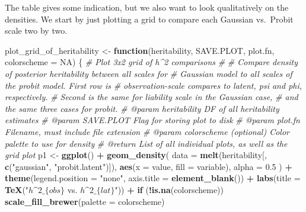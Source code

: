 \documentclass[
]{article}
\newenvironment{Shaded}{\begin{snugshade}}{\end{snugshade}}
\newcommand{\AttributeTok}[1]{\textcolor[rgb]{0.13,0.29,0.53}{#1}}
\newcommand{\CommentTok}[1]{\textcolor[rgb]{0.56,0.35,0.01}{\textit{#1}}}
\newcommand{\ConstantTok}[1]{\textcolor[rgb]{0.56,0.35,0.01}{#1}}
\newcommand{\ControlFlowTok}[1]{\textcolor[rgb]{0.13,0.29,0.53}{\textbf{#1}}}
\newcommand{\FloatTok}[1]{\textcolor[rgb]{0.00,0.00,0.81}{#1}}
\newcommand{\FunctionTok}[1]{\textcolor[rgb]{0.13,0.29,0.53}{\textbf{#1}}}
\newcommand{\NormalTok}[1]{#1}
\newcommand{\OtherTok}[1]{\textcolor[rgb]{0.56,0.35,0.01}{#1}}
\newcommand{\SpecialCharTok}[1]{\textcolor[rgb]{0.81,0.36,0.00}{\textbf{#1}}}
\newcommand{\StringTok}[1]{\textcolor[rgb]{0.31,0.60,0.02}{#1}}
\begin{document}
The table gives some indication, but we also want to look qualitatively
on the densities. We start by just plotting a grid to compare each
Gaussian vs.~Probit scale two by two.

\begin{Shaded}
\begin{Highlighting}[]
\NormalTok{plot\_grid\_of\_heritability }\OtherTok{\textless{}{-}} \ControlFlowTok{function}\NormalTok{(heritability, SAVE.PLOT,}
\NormalTok{                                      plot.fn, }\AttributeTok{colorscheme =} \ConstantTok{NA}\NormalTok{) \{}
  \CommentTok{\#\textquotesingle{} Plot 3x2 grid of h\^{}2 comparisons}
  \CommentTok{\#\textquotesingle{}}
  \CommentTok{\#\textquotesingle{} Compare density of posterior heritability between all scales for}
  \CommentTok{\#\textquotesingle{} Gaussian model to all scales of the probit model. First row is}
  \CommentTok{\#\textquotesingle{} observation{-}scale compares to latent, psi and phi, respectively.}
  \CommentTok{\#\textquotesingle{} Second is the same for liability scale in the Gaussian case,}
  \CommentTok{\#\textquotesingle{} and the same three cases for probit.}
  \CommentTok{\#\textquotesingle{} @param heritability DF of all heritability estimates}
  \CommentTok{\#\textquotesingle{} @param SAVE.PLOT Flag for storing plot to disk}
  \CommentTok{\#\textquotesingle{} @param plot.fn Filename, must include file extension}
  \CommentTok{\#\textquotesingle{} @param colorscheme (optional) Color palette to use for density}
  \CommentTok{\#\textquotesingle{} @return List of all individual plots, as well as the grid plot}
\NormalTok{  p1 }\OtherTok{\textless{}{-}} \FunctionTok{ggplot}\NormalTok{() }\SpecialCharTok{+}
    \FunctionTok{geom\_density}\NormalTok{(}
      \AttributeTok{data =} \FunctionTok{melt}\NormalTok{(heritability[, }\FunctionTok{c}\NormalTok{(}\StringTok{"gaussian"}\NormalTok{, }\StringTok{"probit.latent"}\NormalTok{)]),}
      \FunctionTok{aes}\NormalTok{(}\AttributeTok{x =}\NormalTok{ value, }\AttributeTok{fill =}\NormalTok{ variable), }\AttributeTok{alpha =} \FloatTok{0.5}
\NormalTok{    ) }\SpecialCharTok{+}
    \FunctionTok{theme}\NormalTok{(}\AttributeTok{legend.position =} \StringTok{"none"}\NormalTok{, }\AttributeTok{axis.title =} \FunctionTok{element\_blank}\NormalTok{()) }\SpecialCharTok{+}
    \FunctionTok{labs}\NormalTok{(}\AttributeTok{title =} \FunctionTok{TeX}\NormalTok{(}\StringTok{"$h\^{}2\_\{obs\}$ vs. $h\^{}2\_\{lat\}$"}\NormalTok{)) }\SpecialCharTok{+}
    \ControlFlowTok{if}\NormalTok{ (}\SpecialCharTok{!}\FunctionTok{is.na}\NormalTok{(colorscheme)) }\FunctionTok{scale\_fill\_brewer}\NormalTok{(}\AttributeTok{palette =}\NormalTok{ colorscheme)}

\end{Highlighting}
\end{Shaded}
\end{document}
